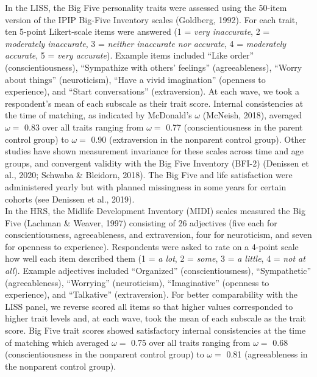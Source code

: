 \documentclass[
  english,
  man, noextraspace]{apa7}
\begin{document}
In the LISS, the Big Five personality traits were assessed using the 50-item version of the IPIP Big-Five Inventory scales (Goldberg, 1992). For each trait, ten 5-point Likert-scale items were answered (1 = \emph{very inaccurate}, 2 = \emph{moderately inaccurate}, 3 = \emph{neither inaccurate nor accurate}, 4 = \emph{moderately accurate}, 5 = \emph{very accurate}). Example items included \enquote{Like order} (conscientiousness), \enquote{Sympathize with others' feelings} (agreeableness), \enquote{Worry about things} (neuroticism), \enquote{Have a vivid imagination} (openness to experience), and \enquote{Start conversations} (extraversion). At each wave, we took a respondent's mean of each subscale as their trait score. Internal consistencies at the time of matching, as indicated by McDonald's \(\omega\) (McNeish, 2018), averaged \(\omega =\) 0.83 over all traits ranging from \(\omega =\) 0.77 (conscientiousness in the parent control group) to \(\omega =\) 0.90 (extraversion in the nonparent control group). Other studies have shown measurement invariance for these scales across time and age groups, and convergent validity with the Big Five Inventory (BFI-2) (Denissen et al., 2020; Schwaba \& Bleidorn, 2018). The Big Five and life satisfaction were administered yearly but with planned missingness in some years for certain cohorts (see Denissen et al., 2019). \\
In the HRS, the Midlife Development Inventory (MIDI) scales measured the Big Five (Lachman \& Weaver, 1997) consisting of 26 adjectives (five each for conscientiousness, agreeableness, and extraversion, four for neuroticism, and seven for openness to experience). Respondents were asked to rate on a 4-point scale how well each item described them (1 = \emph{a lot}, 2 = \emph{some}, 3 = \emph{a little}, 4 = \emph{not at all}). Example adjectives included \enquote{Organized} (conscientiousness), \enquote{Sympathetic} (agreeableness), \enquote{Worrying} (neuroticism), \enquote{Imaginative} (openness to experience), and \enquote{Talkative} (extraversion). For better comparability with the LISS panel, we reverse scored all items so that higher values corresponded to higher trait levels and, at each wave, took the mean of each subscale as the trait score. Big Five trait scores showed satisfactory internal consistencies at the time of matching which averaged \(\omega =\) 0.75 over all traits ranging from \(\omega =\) 0.68 (conscientiousness in the nonparent control group) to \(\omega =\) 0.81 (agreeableness in the nonparent control group).
\end{document}
